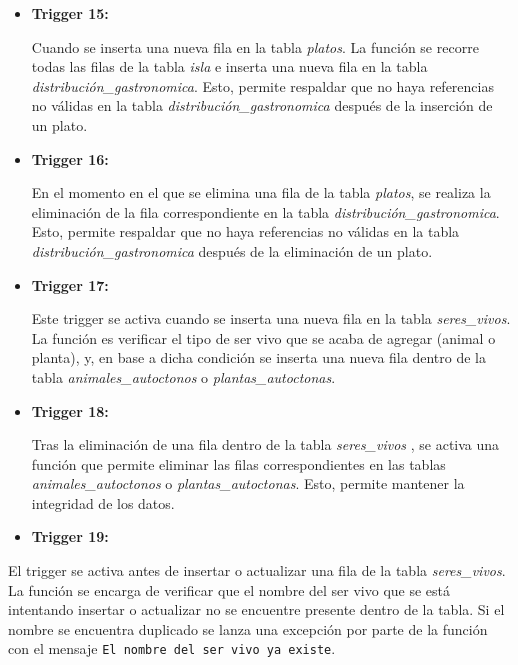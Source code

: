 \documentclass[11pt]{report}
\begin{document}
\begin{itemize}
      \item \textbf{Trigger 15:} 
            \lstset{style=mystyle}
            

Cuando se inserta una nueva fila en la tabla \emph{platos}. La función se recorre todas las filas de la tabla \emph{isla} e inserta una nueva fila en la tabla \emph{distribución\_gastronomica}. Esto, permite respaldar que no haya referencias no válidas en la tabla \emph{distribución\_gastronomica} después de la inserción de un plato.

      \item \textbf{Trigger 16:} 
            \lstset{style=mystyle}
            

En el momento en el que se elimina una fila de la tabla \emph{platos}, se realiza la eliminación de la fila correspondiente en la tabla \emph{distribución\_gastronomica}. Esto, permite respaldar que no haya referencias no válidas en la tabla \emph{distribución\_gastronomica} después de la eliminación de un plato.

      \item \textbf{Trigger 17:} 
            \lstset{style=mystyle}
            

Este trigger se activa cuando se inserta una nueva fila en la tabla \emph{seres\_vivos}. La función es verificar el tipo de ser vivo que se acaba de agregar (animal o planta), y, en base a dicha condición se inserta una nueva fila dentro de la tabla \emph{animales\_autoctonos} o \emph{plantas\_autoctonas}.

      \item \textbf{Trigger 18:} 
            \lstset{style=mystyle}
            

Tras la eliminación de una fila dentro de la tabla \emph{seres\_vivos }, se activa una función que permite eliminar las filas correspondientes en las tablas \emph{animales\_autoctonos} o \emph{plantas\_autoctonas}. Esto, permite mantener la integridad de los datos.

      \item \textbf{Trigger 19:} 
            \lstset{style=mystyle}
            
\end{itemize}

El trigger se activa antes de insertar o actualizar una fila de la tabla \emph{seres\_vivos}. La función se encarga de verificar que el nombre del ser vivo que se está intentando insertar o actualizar no se encuentre presente dentro de la tabla. Si el nombre se encuentra duplicado se lanza una excepción por parte de la función con el mensaje \texttt{El nombre del ser vivo ya existe}.
\end{document}
